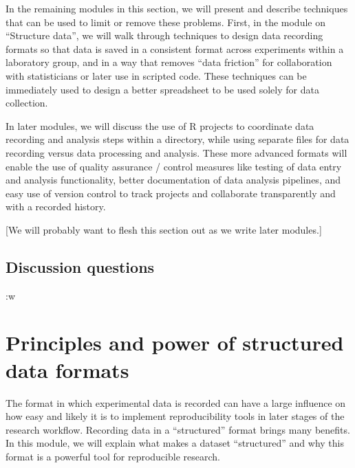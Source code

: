 \documentclass[]{tufte-book}
\begin{document}
In the remaining modules in this section, we will present and describe techniques
that can be used to limit or remove these problems. First, in the module on
``Structure data'', we will walk through techniques to design data recording
formats so that data is saved in a consistent format across experiments within
a laboratory group, and in a way that removes ``data friction'' for collaboration
with statisticians or later use in scripted code. These techniques can be immediately
used to design a better spreadsheet to be used solely for data collection.

In later modules, we will discuss the use of R projects to coordinate data
recording and analysis steps within a directory, while using separate files for
data recording versus data processing and analysis. These more advanced formats
will enable the use of quality assurance / control measures like testing of data
entry and analysis functionality, better documentation of data analysis pipelines,
and easy use of version control to track projects and collaborate transparently and
with a recorded history.

{[}We will probably want to flesh this section out as we write later modules.{]}

\hypertarget{discussion-questions}{%
\subsection{Discussion questions}\label{discussion-questions}}

:w

\hypertarget{principles-and-power-of-structured-data-formats}{%
\section{Principles and power of structured data formats}\label{principles-and-power-of-structured-data-formats}}

The format in which experimental data is recorded can have a large influence on
how easy and likely it is to implement reproducibility tools in later stages of
the research workflow. Recording data in a ``structured'' format brings many
benefits. In this module, we will explain what makes a dataset ``structured'' and
why this format is a powerful tool for reproducible research.
\end{document}
